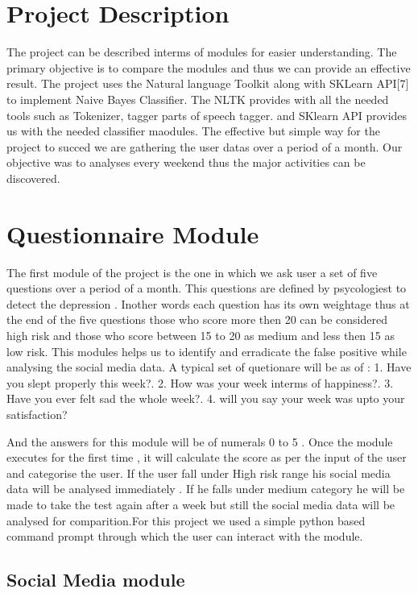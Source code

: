 \documentclass{chi2009}
\begin{document}
\begin{Abstract}
\section{Project Description}

The project can be described interms of modules for easier understanding. The primary objective is to compare the modules and thus we can provide an effective result. The project uses the Natural language Toolkit along with SKLearn API[7] to implement Naive Bayes Classifier. The NLTK provides with all the needed tools such as Tokenizer, tagger parts of speech tagger. and SKlearn API provides us with the needed classifier maodules. The effective but simple way for the project to succed we are gathering the user datas over a period of a month. Our objective was to analyses every weekend thus the major activities can be discovered. 


\section{Questionnaire Module}
The first module of the project is the one in which we ask user a set of five questions over a period of a month. This questions are defined by psycologiest to detect the depression . Inother words each question has its own weightage thus at the end of the five questions those who score more then 20 can be considered high risk and those who score between 15 to 20 as medium and less then 15 as low risk. This modules helps us to identify and erradicate the false positive while analysing the social media data. A typical set of quetionare will be as of : 
1. Have you slept properly this week?. 
2. How was your week interms of happiness?.
3. Have you ever felt sad the whole week?.
4. will you say your week was upto your satisfaction?

And the answers for this module will be of numerals 0 to 5 . Once the module executes for the first time , it will calculate the score as per the input of the user and categorise the user. If the user fall under High risk range his social media data will be analysed immediately . If he falls under medium category he will be made to take the test again after a week but still the social media data will be analysed for comparition.For this project we used a simple python based command prompt through which the user can interact with the module. 





\subsection{Social Media module}


\end{Abstract}
\end{document}
